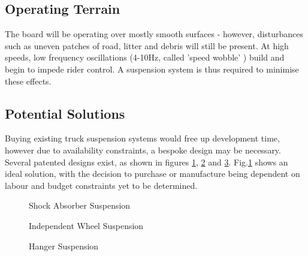 \documentclass[journal,10pt]{IEEEtran}
\begin{document}
    \subsection{Operating Terrain}
        The board will be operating over mostly smooth surfaces - however, disturbances such as uneven patches of road, litter and debris will still be present. At high speeds, low frequency oscillations (4-10Hz, called 'speed wobble' \cite{speedwobble}) build and begin to impede rider control. A suspension system is thus required to minimise these effects.
    \subsection{Potential Solutions}
        Buying existing truck suspension systems would free up development time, however due to availability constraints, a bespoke design may be necessary.
        Several patented designs exist, as shown in figures \ref{fig: Spring Idea}, \ref{fig: Seperate Spring Idea} and \ref{fig: Hanger Idea}. Fig.\ref{fig: Spring Idea} shows an ideal solution, with the decision to purchase or manufacture being dependent on labour and budget constraints yet to be determined.
        \begin{figure}[H]
            \centering
            \caption{%
            Shock Absorber Suspension
            \cite{spring_idea} \cite{shockabsorber}}
            \label{fig: Spring Idea}
        \end{figure}
        \begin{figure}[H]
            \centering
            \caption{%
            Independent Wheel Suspension
            \cite{separate_spring}}
            \label{fig: Seperate Spring Idea}
        \end{figure}
        \begin{figure}[H]
            \centering
            \caption{%
            Hanger Suspension
            \cite{hanger}}
            \label{fig: Hanger Idea}
        \end{figure}
\end{document}
